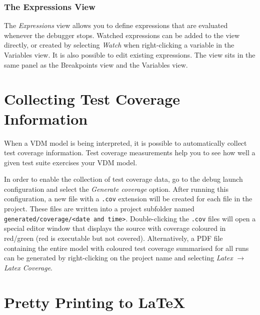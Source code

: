 \documentclass{overturerepchap}
\begin{document}
\subsection{The Expressions View}

The \emph{Expressions} view allows you to define expressions that are evaluated
whenever the debugger stops.
Watched expressions can be added to the view directly, or created by selecting \emph{Watch}
when right-clicking a variable in the Variables view. It is also possible to edit existing
expressions. The view sits in the same panel as the Breakpoints view and
the Variables view.

\chapter{Collecting Test Coverage Information}\label{sec:testcoverage}

When a VDM model is being interpreted, it is possible to automatically collect
test coverage information. Test coverage measurements help you to see how well a
given test suite exercises your VDM model.

In order to enable the collection of test coverage data, go to the debug launch 
configuration and select the \emph{Generate coverage} option. After
running this configuration, a new file with a \texttt{.cov} extension will be created for 
each file in the project. These files are written into a project subfolder named
\texttt{generated/coverage/<date and time>}. Double-clicking the \texttt{.cov} files
will open a special editor window that displays the source with coverage
coloured in red/green (red is executable but not covered). Alternatively, a PDF file
containing the entire model with coloured test coverage summarised for all runs
can be generated 
by right-clicking on the project name and selecting \emph{Latex} $\rightarrow$ 
\emph{Latex Coverage}.

\chapter{Pretty Printing to \LaTeX}\label{sec:prettyprint}

\end{document}

